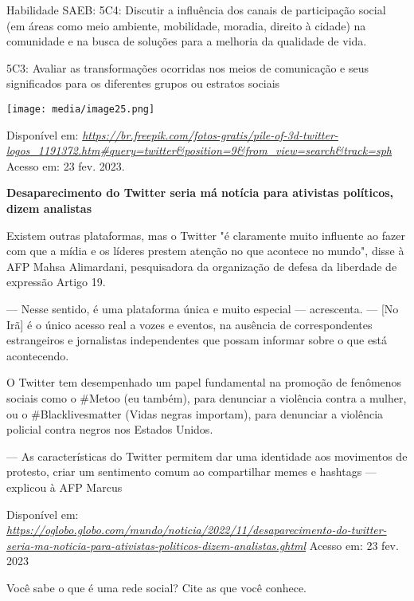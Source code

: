 Habilidade SAEB: 5C4: Discutir a influência dos canais de participação
social (em áreas como meio ambiente, mobilidade, moradia, direito à
cidade) na comunidade e na busca de soluções para a melhoria da
qualidade de vida.

5C3: Avaliar as transformações ocorridas nos meios de comunicação e seus
significados para os diferentes grupos ou estratos sociais

\texttt{[image: media/image25.png]}

Disponível em:
\href{https://br.freepik.com/fotos-gratis/pile-of-3d-twitter-logos_1191372.htm\#query=twitter\&position=9\&from_view=search\&track=sph}{\emph{https://br.freepik.com/fotos-gratis/pile-of-3d-twitter-logos\_1191372.htm\#query=twitter\&position=9\&from\_view=search\&track=sph}}
Acesso em: 23 fev. 2023.

\textbf{Desaparecimento do Twitter seria má notícia para ativistas
políticos, dizem analistas }

Existem outras plataformas, mas o Twitter "é claramente muito influente
ao fazer com que a mídia e os líderes prestem atenção no que acontece no
mundo", disse à AFP Mahsa Alimardani, pesquisadora da organização de
defesa da liberdade de expressão Artigo 19.

--- Nesse sentido, é uma plataforma única e muito especial ---
acrescenta. --- {[}No Irã{]} é o único acesso real a vozes e eventos, na
ausência de correspondentes estrangeiros e jornalistas independentes que
possam informar sobre o que está acontecendo.

O Twitter tem desempenhado um papel fundamental na promoção de fenômenos
sociais como o \#Metoo (eu também), para denunciar a violência contra a
mulher, ou o \#Blacklivesmatter (Vidas negras importam), para denunciar
a violência policial contra negros nos Estados Unidos.

--- As características do Twitter permitem dar uma identidade aos
movimentos de protesto, criar um sentimento comum ao compartilhar memes
e hashtags --- explicou à AFP Marcus

Disponível em:
\href{https://oglobo.globo.com/mundo/noticia/2022/11/desaparecimento-do-twitter-seria-ma-noticia-para-ativistas-politicos-dizem-analistas.ghtml}{\emph{https://oglobo.globo.com/mundo/noticia/2022/11/desaparecimento-do-twitter-seria-ma-noticia-para-ativistas-politicos-dizem-analistas.ghtml}}
Acesso em: 23 fev. 2023

Você sabe o que é uma rede social? Cite as que você conhece.

